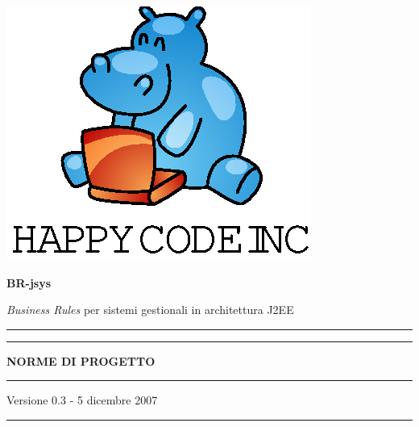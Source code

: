 \documentclass[11pt,titlepage,a4paper]{report}
\begin{document}
\begin{titlepage}
\begin{center}
\vspace*{0.5in}
\includegraphics{logo.eps}
\vspace*{0.2in}

{\Large \textbf{BR-jsys}}

{\Large \emph{Business Rules} per sistemi gestionali in architettura J2EE } 
\vspace{1.3in}
\par\rule{10cm}{.4pt} \par
\par\rule{12cm}{1pt} \par
\vspace*{0.5in}
\LARGE \textbf {NORME DI PROGETTO}
\vspace*{0.5in}
\par\rule{12cm}{1pt} \par
{\large Versione 0.3 - 5 dicembre 2007}
\par\rule{10cm}{.4pt} \par

\end{center}
\end{titlepage}
\vspace*{0.5in}
\end{document}
